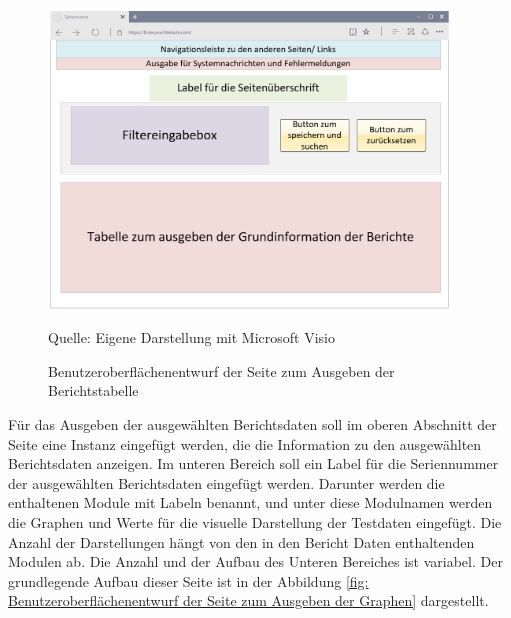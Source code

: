 \begin{figure}[H]
    \centering
    \includegraphics[width=0.95\textwidth]{Grafiken/Overlay_Tabellenseite}
    \caption{Benutzeroberflächenentwurf der Seite zum Ausgeben der Berichtstabelle}
    \label{fig: Benutzeroberflächenentwurf der Seite zum Ausgeben der Berichtstabelle}
    {Quelle: Eigene Darstellung mit Microsoft Visio}
\end{figure}

Für das Ausgeben der ausgewählten Berichtsdaten soll im oberen Abschnitt der Seite eine Instanz
eingefügt werden, die die Information zu den ausgewählten Berichtsdaten anzeigen.
Im unteren Bereich soll ein Label für die Seriennummer der ausgewählten Berichtsdaten eingefügt
werden.
Darunter werden die enthaltenen Module mit Labeln benannt, und unter diese Modulnamen werden
die Graphen und Werte für die visuelle Darstellung der Testdaten eingefügt. Die Anzahl der Darstellungen
hängt von den in den Bericht Daten enthaltenden Modulen ab. Die Anzahl und der Aufbau des Unteren
Bereiches ist variabel. Der grundlegende Aufbau dieser Seite ist in der Abbildung \ref{fig: Benutzeroberflächenentwurf der Seite zum Ausgeben der Graphen} dargestellt.

